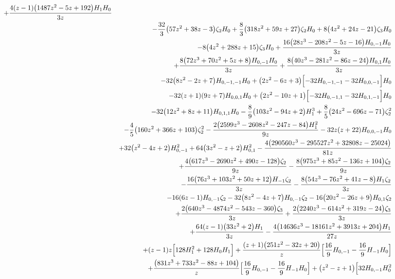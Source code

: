 \begin{eqnarray}
+\frac{4 (z-1) \big(1487 z^2-5 z+192\big) H_1 H_0}{3 z}
\nonumber \\ &&
-\frac{32}{3} \big(57 z^2+38 z-3\big) \zeta_2H_0
+\frac{8}{3}  \big(318 z^2+59 z+27\big) \zeta_2 H_0+8 \big(4 z^2+24 z-21\big) \zeta_3 H_0
\nonumber \\ &&
-8 \big(4 z^2+288 z+15\big) \zeta_3 H_0
+\frac{16   \big(28 z^3-208 z^2-5 z-16\big) H_{0,-1} H_0}{3 z}
\nonumber \\ &&
+\frac{8 \big(72 z^3+70  z^2+5 z+8\big) H_{0,-1} H_0}{3 z}
+\frac{8 \big(40 z^3-281 z^2-86 z-24\big)  H_{0,1} H_0}{3 z}
\nonumber \\ &&
-32  \big(8 z^2-2 z+7\big) H_{0,-1,-1} H_0
+\big(2z^2-6 z+3\big) \Bigl[-32 H_{0,-1,-1}-32 H_{0,0,-1}\Bigr] H_0
\nonumber \\ &&
-32 (z+1) (9 z+7) H_{0,0,1} H_0+\big(2 z^2-10 z+1\big) \Bigl[-32H_{0,-1,1}-32 H_{0,1,-1}\Bigr] H_0
\nonumber \\ &&
-32 \big(12 z^2+8 z+11\big) H_{0,1,1}H_0-\frac{8}{9} \big(103 z^2-94 z+2\big) H_1^3+\frac{8}{5} \big(24 z^2-696z-71\big) \zeta_2^2
\nonumber \\ &&
-\frac{4}{5}  \big(160 z^2+366 z+103\big)\zeta_2^2-\frac{2 \big(2599 z^3-2608 z^2-247 z-84\big) H_1^2}{9 z}
-32  z (z+22)H_{0,0,-1} H_0
\nonumber \\ &&
+32 \big(z^2-4 z+2\big) H_{0,-1}^2+64 \big(3 z^2-z+2\big) H_{0,1}^2-\frac{4  \big(290560 z^3-295527 z^2+32808 z-25024\big)}{81 z}
\nonumber \\ &&
+\frac{4 \big(617  z^3-2690 z^2+490 z-128\big) \zeta_2}{9 z}-\frac{8  \big(975  z^3+85 z^2-136 z+104\big) \zeta_2}{9 z}
\nonumber \\ &&
-\frac{16  \big(76 z^3+103  z^2+50 z+12\big) H_{-1} \zeta_2}{3 z}-\frac{8 \big(54 z^3-76 z^2+41  z-8\big) H_1 \zeta_2}{3 z}
\nonumber \\ &&
-16  (6 z-1) H_{0,-1} \zeta_2-32\big(8 z^2-4 z+7\big) H_{0,-1} \zeta_2-16 \big(20 z^2-26 z+9\big) H_{0,1}\zeta_2
\nonumber \\ &&
+\frac{2 \big(640 z^3-4874 z^2-543 z-360\big) \zeta_3}{3  z}+\frac{2  \big(2240 z^3-614 z^2+319 z-24\big) \zeta_3}{3  z}
\nonumber \\ &&
+\frac{64  (z-1) \big(33 z^2+2\big) H_1}{3 z}-\frac{4 \big(14636  z^3-18161 z^2+3913 z+204\big) H_1}{27 z}
\nonumber \\ &&
+(z-1) z \Bigl[128  H_1^2+128 H_0 H_1\Bigr]+\frac{(z+1) \big(251 z^2-32 z+20\big)}{z} \Bigl[\frac{16}{9}  H_{0,-1}-\frac{16}{9} H_{-1} H_0\Bigr]
\nonumber \\ &&
+\frac{\big(831 z^3+733 z^2-88  z+104\big)}{z} \Bigl[\frac{16}{9}  H_{0,-1}-\frac{16}{9}  H_{-1}  H_0\Bigr]+\big(z^2-z+1\big) \Bigl[32 H_{0,-1} H_0^2

\end{eqnarray}
